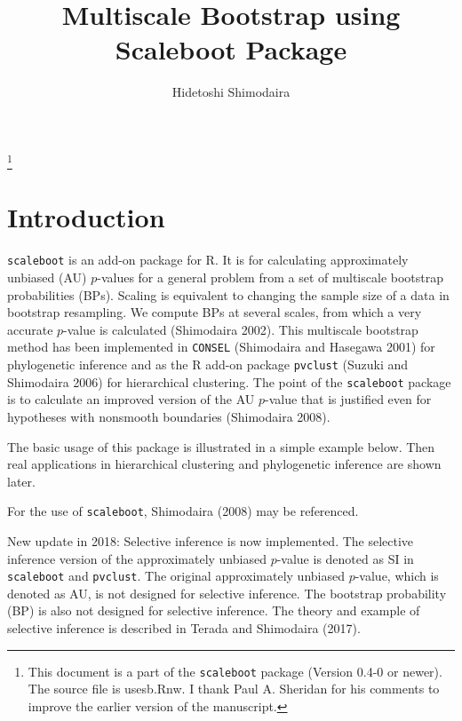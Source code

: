 \documentclass[a4paper]{amsart}
\begin{document}



\title{Multiscale Bootstrap using Scaleboot Package}
\author{Hidetoshi Shimodaira}
\thanks{This document is a part of the {\tt scaleboot} package (Version 0.4-0 or newer). The source file is usesb.Rnw.
I thank Paul A. Sheridan for his comments to improve the earlier version of the manuscript.}
\address{Graduate School of Informatics, Kyoto University,
Yoshida Honmachi, Sakyo-ku, Kyoto, 606-8501, Japan}


\maketitle

\section{Introduction}

{\tt scaleboot} is an add-on package for R. It is for calculating
approximately unbiased (AU) $p$-values for a general problem from a set
of multiscale bootstrap probabilities (BPs). Scaling is equivalent to
changing the sample size of a data in bootstrap resampling. We
compute BPs at several scales, from which a very accurate $p$-value is
calculated (Shimodaira 2002). This multiscale bootstrap method has
been implemented in {\tt CONSEL} (Shimodaira and Hasegawa 2001) for
phylogenetic inference and as the R add-on package {\tt pvclust}
(Suzuki and Shimodaira 2006) for hierarchical clustering. The point of
the {\tt scaleboot} package is to calculate an improved version of the
AU $p$-value that is justified even for hypotheses with nonsmooth
boundaries (Shimodaira 2008).

The basic usage of this package is illustrated in a simple example
below.  Then real applications in hierarchical clustering and
phylogenetic inference are shown later.

For the use of {\tt scaleboot}, Shimodaira (2008) may be referenced.

New update in 2018: Selective inference is now implemented.
The selective inference version of the approximately unbiased $p$-value
is denoted as SI in {\tt scaleboot} and {\tt pvclust}. The original approximately unbiased 
$p$-value, which is denoted as AU, is not designed for selective inference.
The bootstrap probability (BP) is also not designed for selective inference.
The theory and example of selective inference is described in Terada and Shimodaira (2017).
\end{document}

